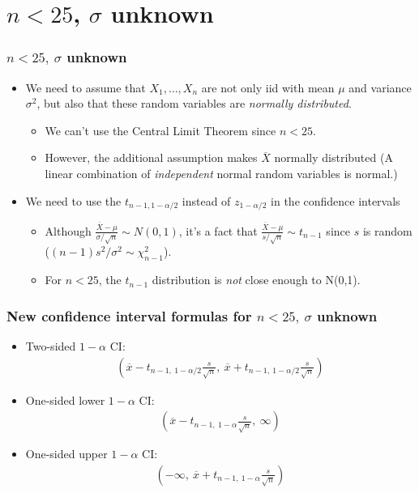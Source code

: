 \documentclass[handout]{beamer}\usepackage{graphicx, color}
\providecommand{\ov}[1]{\overline{#1}}
\numberwithin{equation}{section}
\begin{document}
\section{$n < 25$, $\sigma$ unknown}

\begin{frame}
\frametitle{$n < 25, \ \sigma$ unknown}
\begin{itemize}
\item We need to assume that $X_1, \ldots, X_n$ are not only iid with mean $\mu$ and variance $\sigma^2$, but also that these random variables are \emph{normally distributed}.
\begin{itemize}
\pause \item We can't use the Central Limit Theorem since $n < 25$. 
\pause \item However, the additional assumption makes $\ov{X}$ normally distributed (A linear combination of \emph{independent} normal random variables is normal.)
\end{itemize}
\pause \item We need to use the $t_{n - 1, 1 - \alpha/2}$ instead of $z_{1 - \alpha/2}$ in the confidence intervals
\begin{itemize}
\pause \item Although $\frac{\ov{X} - \mu}{\sigma/\sqrt{n}} \sim N(0,1)$, it's a fact that $\frac{\ov{X} - \mu}{s/\sqrt{n}} \sim t_{n - 1}$ since $s$ is random ($(n-1)s^2/\sigma^2 \sim \chi^2_{n-1}$).
\pause \item For $n < 25$, the $t_{n - 1}$ distribution is \emph{not} close enough to N(0,1).
\end{itemize}
\end{itemize}
\end{frame}


\begin{frame}
\frametitle{New confidence interval formulas for $n < 25, \ \sigma$ unknown}
\begin{itemize}
\item Two-sided $1 - \alpha$ CI:
\pause \begin{align*}
(\ov{x} - t_{n - 1, \ 1 - \alpha/2} \frac{s}{\sqrt{n}},\ \ov{x} + t_{n - 1, \ 1- \alpha/2 } \frac{s}{\sqrt{n}})
\end{align*} 
\pause \item One-sided lower $1 - \alpha$ CI:
\pause \begin{align*}
(\ov{x} - t_{n - 1, \ 1 - \alpha} \frac{s}{\sqrt{n}}, \ \infty)
\end{align*} 
\pause \item One-sided upper $1 - \alpha$ CI:
\pause \begin{align*}
(-\infty, \ \ov{x} + t_{n - 1, \ 1- \alpha } \frac{s}{\sqrt{n}})
\end{align*} 
\end{itemize}
\end{frame}
\end{document}
